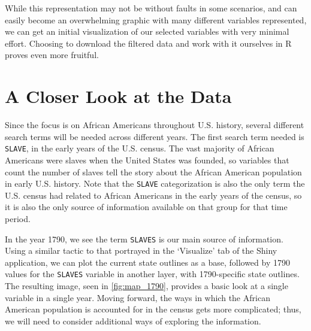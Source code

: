 \documentclass[DIV=calc, paper=a4, fontsize=10pt, twocolumn]{scrartcl}\usepackage[]{graphicx}\usepackage[]{color}
\begin{document}
\par While this representation may not be without faults in some scenarios, and can easily become an overwhelming graphic with many different variables represented, we can get an initial visualization of our selected variables with very minimal effort. Choosing to download the filtered data and work with it ourselves in R proves even more fruitful. 

\section*{A Closer Look at the Data}


\par Since the focus is on African Americans throughout U.S. history, several different search terms will be needed across different years. The first search term needed is \texttt{SLAVE}, in the early years of the U.S. census. The vast majority of African Americans were slaves when the United States was founded, so variables that count the number of slaves tell the story about the African American population in early U.S. history. Note that the \texttt{SLAVE} categorization is also the only term the U.S. census had related to African Americans in the early years of the census, so it is also the only source of information available on that group for that time period.  





\par In the year 1790, we see the term \texttt{SLAVES} is our main source of information. Using a similar tactic to that portrayed in the `Visualize' tab of the Shiny application, we can plot the current state outlines as a base, followed by 1790 values for the \texttt{SLAVES} variable in another layer, with 1790-specific state outlines. The resulting image, seen in \autoref{fig:map_1790}, provides a basic look at a single variable in a single year. Moving forward, the ways in which the African American population is accounted for in the census gets more complicated; thus, we will need to consider additional ways of exploring the information.  
\end{document}
